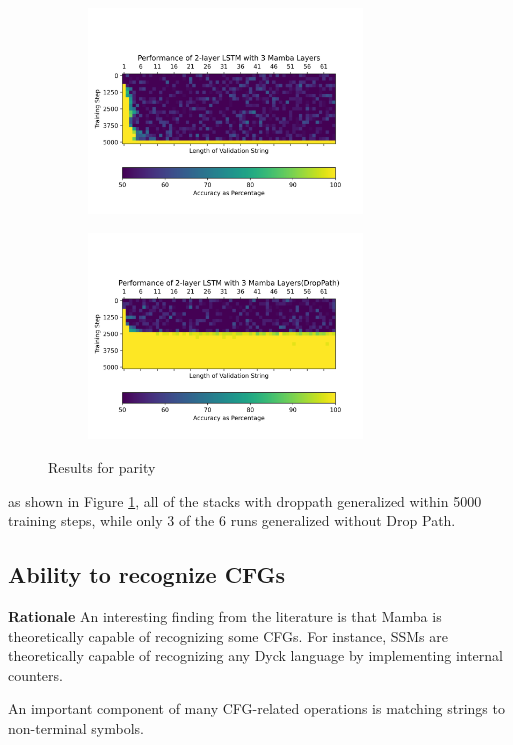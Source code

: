 \begin{figure}
\begin{subfigure}{0.5\textwidth}
\begin{center}
        \includegraphics[width=0.8\textwidth]{figures/parity_lstm_False_5_2.png.png}
        \end{center}
    \end{subfigure}\begin{subfigure}{0.5\textwidth}
        \begin{center}
        \includegraphics[width=0.8\textwidth]{figures/parity_lstm_True_5_2.png.png}
        \end{center}
    \end{subfigure}
    \caption{Results for parity}
    \label{droppathresults}
\end{figure}
as shown in Figure \ref{droppathresults}, all of the stacks with droppath
generalized within 5000 training steps, while only 3 of the 6 runs generalized
without Drop Path.

\subsection{Ability to recognize CFGs}

\textbf{Rationale} An interesting finding from the literature is that Mamba is
theoretically capable of recognizing some CFGs. For instance, SSMs are
theoretically capable of recognizing any Dyck language by implementing internal
counters.

An important component of many CFG-related operations is matching strings to
non-terminal symbols.




